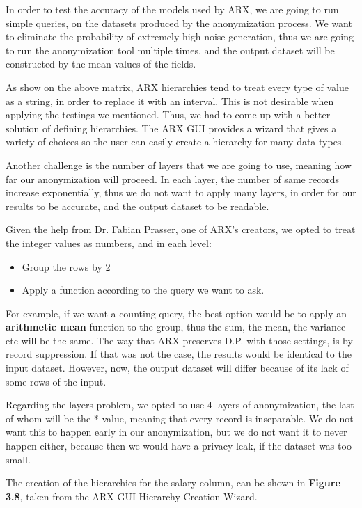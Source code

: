 In order to test the accuracy of the models used by ARX, we are going to run simple queries, on the datasets produced by the anonymization process. We want to eliminate the probability of extremely high noise generation, thus we are going to run the anonymization tool multiple times, and the output dataset will be constructed by the mean values of the fields.

As show on the above matrix, ARX hierarchies tend to treat every type of value as a string, in order to replace it with an interval. This is not  desirable when applying the testings we mentioned. Thus, we had to come up with a better solution of defining hierarchies. The ARX GUI provides a wizard that gives a variety of choices so the user can easily create a hierarchy for many data types.

Another challenge is the number of layers that we are going to use, meaning how far our anonymization will proceed. In each layer, the number of same records increase exponentially, thus we do not want to apply many layers, in order for our results to be accurate, and the output dataset to be readable.

Given the help from Dr. Fabian Prasser, one of ARX's creators, we opted to treat the integer values as numbers, and in each level:
\begin{itemize}
    \item Group the rows by 2
    \item Apply a function according to the query we want to ask.
\end{itemize}
 
For example, if we want a counting query, the best option would be to apply an \textbf{arithmetic mean} function to the group, thus the sum, the mean, the variance etc will be the same. The way that ARX preserves D.P. with those settings, is by record suppression. If that was not the case, the results would be identical to the input dataset. However, now, the output dataset will differ because of its lack of some rows of the input.
 
Regarding the layers problem, we opted to use 4 layers of anonymization, the last of whom will be the * value, meaning that every record is inseparable. We do not want this to happen early in our anonymization, but we do not want it to never happen either, because then we would have a privacy leak, if the dataset was too small.

The creation of the hierarchies for the salary column, can be shown in \textbf{Figure 3.8}, taken from the ARX GUI Hierarchy Creation Wizard.

